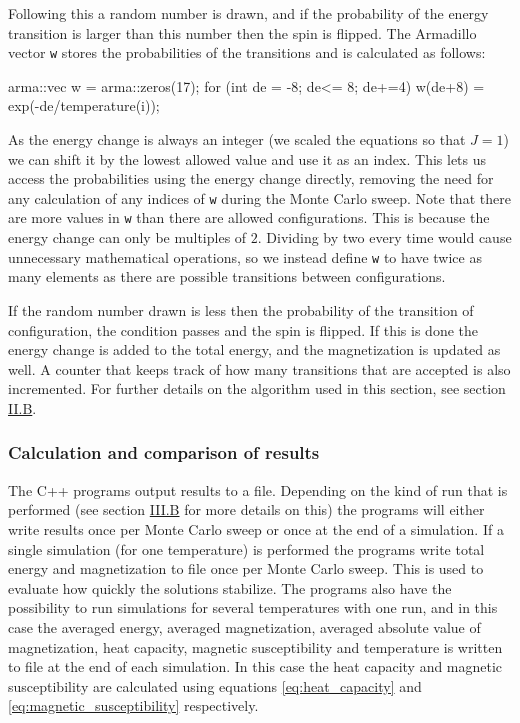 \documentclass[reprint,english,notitlepage]{revtex4-1}  %
\begin{document}
Following this a random number is drawn, and if the probability of the energy transition is larger than this number then the spin is flipped. The Armadillo \citep{Armadillo} vector \verb+w+ stores the probabilities of the transitions and is calculated as follows:

\begin{cpp}
arma::vec w = arma::zeros(17);
for (int de = -8; de<= 8; de+=4) {
  w(de+8) = exp(-de/temperature(i));
}
\end{cpp} 

As the energy change is always an integer (we scaled the equations so that $J=1$) we can shift it by the lowest allowed value and use it as an index. This lets us access the probabilities using the energy change directly, removing the need for any calculation of any indices of \verb+w+ during the Monte Carlo sweep. Note that there are more values in \verb+w+ than there are allowed configurations. This is because the energy change can only be multiples of $2$. Dividing by two every time would cause unnecessary mathematical operations, so we instead define \verb+w+ to have twice as many elements as there are possible transitions between configurations.

If the random number drawn is less then the probability of the transition of configuration, the condition passes and the spin is flipped. If this is done the energy change is added to the total energy, and the magnetization is updated as well. A counter that keeps track of how many transitions that are accepted is also incremented. For further details on the algorithm used in this section, see section \hyperref[sec:II:b]{II.B}. 


\subsubsection{Calculation and comparison of results} \label{sec:III:a:iii}

The C++ programs output results to a file. Depending on the kind of run that is performed (see section \hyperref[sec:III:b]{III.B} for more details on this) the programs will either write results once per Monte Carlo sweep or once at the end of a simulation. If a single simulation (for one temperature) is performed the programs write total energy and magnetization to file once per Monte Carlo sweep. This is used to evaluate how quickly the solutions stabilize. The programs also have the possibility to run simulations for several temperatures with one run, and in this case the averaged energy, averaged magnetization, averaged absolute value of magnetization, heat capacity, magnetic susceptibility and temperature is written to file at the end of each simulation. In this case the heat capacity and magnetic susceptibility are calculated using equations \eqref{eq:heat_capacity} and \eqref{eq:magnetic_susceptibility} respectively.
\end{document}
